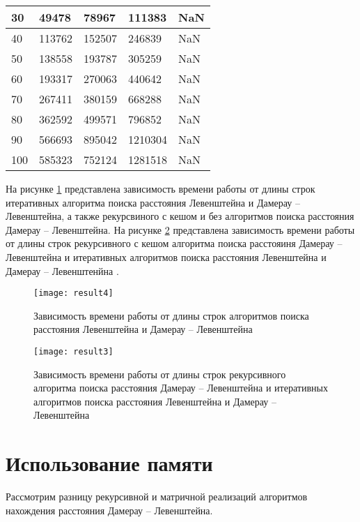 \begin{table}[h]
\begin{center}
\begin{tabular}{|l|l|l|l|l|}
		30  & 49478  & 78967  & 111383  & NaN        \\\hline
		40  & 113762 & 152507 & 246839  & NaN        \\\hline
		50  & 138558 & 193787 & 305259  & NaN        \\\hline
		60  & 193317 & 270063 & 440642  & NaN        \\\hline
		70  & 267411 & 380159 & 668288  & NaN        \\\hline
		80  & 362592 & 499571 & 796852  & NaN        \\\hline
		90  & 566693 & 895042 & 1210304 & NaN      \\\hline
		100 & 585323 & 752124 & 1281518 & NaN		   \\\hline
	\end{tabular}
	\end{center}
\end{table}

На рисунке \ref{img:result4} представлена зависимость времени работы от длины строк итеративных алгоритма поиска расстояния Левенштейна и Дамерау -- Левенштейна, а также рекурсвиного с кешом и без алгоритмов поиска расстояния Дамерау -- Левенштейна. На рисунке \ref{img:result3} представлена зависимость времени работы от длины строк рекурсивного с кешом алгоритма поиска расстояиня Дамерау -- Левенштейна и итеративных алгоритмов поиска расстояния Левенштейна и Дамерау -- Левенштенйна .

\begin{figure}[h]
	\centering
	\texttt{[image: result4]}
	\caption{Зависимость времени работы от длины строк алгоритмов поиска расстояния Левенштейна и Дамерау -- Левенштейна}
	\label{img:result4}
\end{figure}

\begin{figure}[h]
	\centering
	\texttt{[image: result3]}
	\caption{Зависимость времени работы от длины строк рекурсивного алгоритма поиска расстояния Дамерау -- Левенштейна и  итеративных алгоритмов поиска расстояния Левенштейна и Дамерау -- Левенштейна}
	\label{img:result3}
\end{figure}


\clearpage
\newpage
\section{Использование памяти}

Рассмотрим разницу рекурсивной и матричной реализаций алгоритмов нахождения расстояния Дамерау -- Левенштейна.

